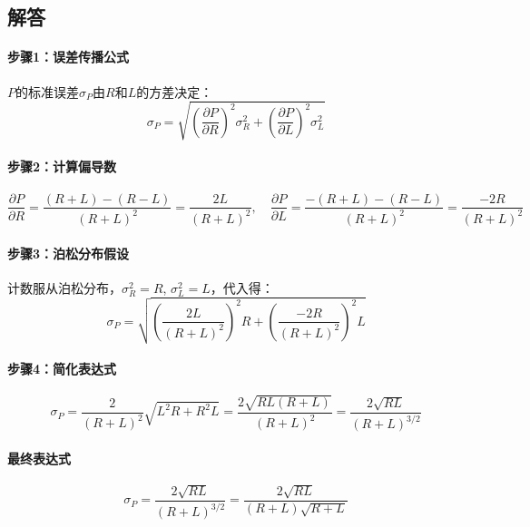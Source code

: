 \documentclass{article}
\begin{document}
\subsection*{解答}

\paragraph{步骤1：误差传播公式}
$P$的标准误差$\sigma_P$由$R$和$L$的方差决定：
$$
\sigma_P = \sqrt{ \left( \frac{\partial P}{\partial R} \right)^2 \sigma_R^2 + \left( \frac{\partial P}{\partial L} \right)^2 \sigma_L^2 }
$$

\paragraph{步骤2：计算偏导数}
$$
\frac{\partial P}{\partial R} = \frac{(R+L) - (R-L)}{(R+L)^2} = \frac{2L}{(R+L)^2}, \quad
\frac{\partial P}{\partial L} = \frac{-(R+L) - (R-L)}{(R+L)^2} = \frac{-2R}{(R+L)^2}
$$

\paragraph{步骤3：泊松分布假设}
计数服从泊松分布，$\sigma_R^2 = R$, $\sigma_L^2 = L$，代入得：
$$
\sigma_P = \sqrt{ \left( \frac{2L}{(R+L)^2} \right)^2 R + \left( \frac{-2R}{(R+L)^2} \right)^2 L }
$$

\paragraph{步骤4：简化表达式}
$$
\sigma_P = \frac{2}{(R+L)^2} \sqrt{L^2 R + R^2 L} = \frac{2\sqrt{RL(R+L)}}{(R+L)^2} = \frac{2\sqrt{RL}}{(R+L)^{3/2}}
$$

\paragraph{最终表达式}
$$
\sigma_P = \frac{2\sqrt{RL}}{(R+L)^{3/2}} = \frac{2\sqrt{RL}}{(R+L)\sqrt{R+L}}
$$
\end{document}

